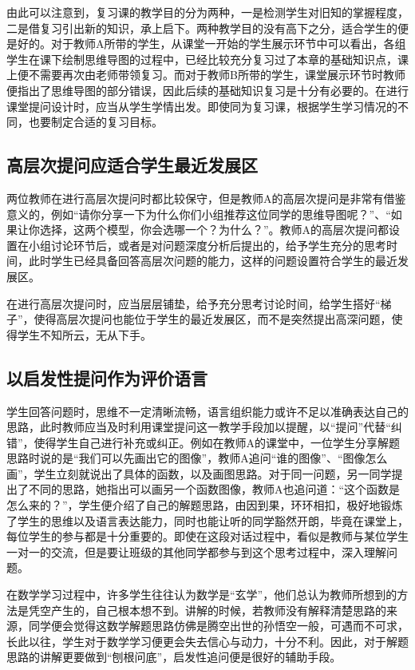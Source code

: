 由此可以注意到，复习课的教学目的分为两种，一是检测学生对旧知的掌握程度，二是借复习引出新的知识，承上启下。两种教学目的没有高下之分，适合学生的便是好的。对于教师A所带的学生，从课堂一开始的学生展示环节中可以看出，各组学生在课下绘制思维导图的过程中，已经比较充分复习过了本章的基础知识点，课上便不需要再次由老师带领复习。而对于教师B所带的学生，课堂展示环节时教师便指出了思维导图的部分错误，因此后续的基础知识复习是十分有必要的。在进行课堂提问设计时，应当从学生学情出发。即使同为复习课，根据学生学习情况的不同，也要制定合适的复习目标。


\subsection{高层次提问应适合学生最近发展区}

两位教师在进行高层次提问时都比较保守，但是教师A的高层次提问是非常有借鉴意义的，例如“请你分享一下为什么你们小组推荐这位同学的思维导图呢？”、“如果让你选择，这两个模型，你会选哪一个？为什么？”。教师A的高层次提问都设置在小组讨论环节后，或者是对问题深度分析后提出的，给予学生充分的思考时间，此时学生已经具备回答高层次问题的能力，这样的问题设置符合学生的最近发展区。

在进行高层次提问时，应当层层铺垫，给予充分思考讨论时间，给学生搭好“梯子”，使得高层次提问也能位于学生的最近发展区，而不是突然提出高深问题，使得学生不知所云，无从下手。


\subsection{以启发性提问作为评价语言}

学生回答问题时，思维不一定清晰流畅，语言组织能力或许不足以准确表达自己的思路，此时教师应当及时利用课堂提问这一教学手段加以提醒，以“提问”代替“纠错”，使得学生自己进行补充或纠正。例如在教师A的课堂中，一位学生分享解题思路时说的是“我们可以先画出它的图像”，教师A追问“谁的图像”、“图像怎么画”，学生立刻就说出了具体的函数，以及画图思路。对于同一问题，另一同学提出了不同的思路，她指出可以画另一个函数图像，教师A也追问道：“这个函数是怎么来的？”，学生便介绍了自己的解题思路，由因到果，环环相扣，极好地锻炼了学生的思维以及语言表达能力，同时也能让听的同学豁然开朗，毕竟在课堂上，每位学生的参与都是十分重要的。即使在这段对话过程中，看似是教师与某位学生一对一的交流，但是要让班级的其他同学都参与到这个思考过程中，深入理解问题。

在数学学习过程中，许多学生往往认为数学是“玄学”，他们总认为教师所想到的方法是凭空产生的，自己根本想不到。讲解的时候，若教师没有解释清楚思路的来源，同学便会觉得这数学解题思路仿佛是腾空出世的孙悟空一般，可遇而不可求，长此以往，学生对于数学学习便更会失去信心与动力，十分不利。因此，对于解题思路的讲解更要做到“刨根问底”，启发性追问便是很好的辅助手段。


